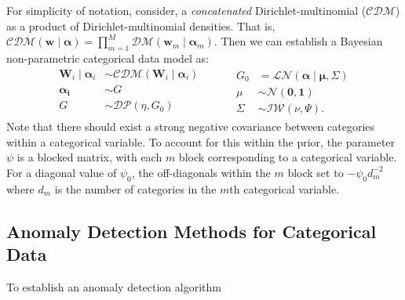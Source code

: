   For simplicity of notation, consider, a \emph{concatenated} Dirichlet-multinomial 
  ($\mathcal{CDM}$) as a product of Dirichlet-multinomial densities.  That is, 
  $\mathcal{CDM}(\bm{w}\mid\bm{\alpha}) = \prod_{m = 1}^M\mathcal{DM}(\bm{w}_m\mid\bm{\alpha}_m)$.
  Then we can establish a Bayesian non-parametric categorical data model as:
  \begin{equation}
    \begin{aligned}
      \bm{W}_i \mid \bm{\alpha}_i &\sim \mathcal{CDM}\left(\bm{W}_i\mid\bm{\alpha}_i\right)\\
      \bm{\alpha_i} &\sim G\\
      G &\sim \mathcal{DP}\left(\eta, G_0\right)\\
    \end{aligned}
    ~\hspace{1cm}
    \begin{aligned}
    G_0 &= \mathcal{LN}\left(\bm{\alpha}\mid\bm{\mu},\Sigma\right)\\
    \mu &\sim \mathcal{N}\left(\bm{0},\bm{1}\right)\\
    \Sigma &\sim \mathcal{IW}\left(\nu, \Psi\right).
    \end{aligned}
  \end{equation}
  Note that there should exist a strong negative covariance between categories 
  within a categorical variable.  To account for this within the prior, the 
  parameter $\psi$ is a blocked matrix, with each $m$ block corresponding to a 
  categorical variable.  For a diagonal value of $\psi_0$, the off-diagonals 
  within the $m$ block set to $-\psi_0 d_m^{-2}$ where $d_m$ is the number of 
  categories in the $m$th categorical variable.

\subsection{Anomaly Detection Methods for Categorical Data}
To establish an anomaly detection algorithm 

